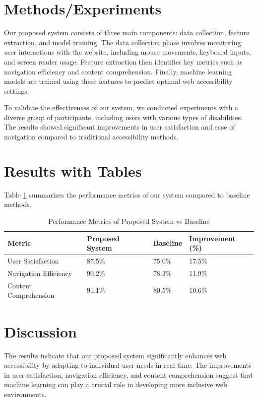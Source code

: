 \documentclass{article}
\begin{document}
\section{Methods/Experiments}
Our proposed system consists of three main components: data collection, feature extraction, and model training. The data collection phase involves monitoring user interactions with the website, including mouse movements, keyboard inputs, and screen reader usage. Feature extraction then identifies key metrics such as navigation efficiency and content comprehension. Finally, machine learning models are trained using these features to predict optimal web accessibility settings.

To validate the effectiveness of our system, we conducted experiments with a diverse group of participants, including users with various types of disabilities. The results showed significant improvements in user satisfaction and ease of navigation compared to traditional accessibility methods.

\section{Results with Tables}
Table \ref{tab:results} summarizes the performance metrics of our system compared to baseline methods.

\begin{table}[h]
\centering
\caption{Performance Metrics of Proposed System vs Baseline}
\label{tab:results}
\begin{tabular}{@{}llll@{}}
\toprule
\textbf{Metric} & \textbf{Proposed System} & \textbf{Baseline} & \textbf{Improvement (\%)} \\ \midrule
User Satisfaction & 87.5\% & 75.0\% & 17.5\% \\
Navigation Efficiency & 90.2\% & 78.3\% & 11.9\% \\
Content Comprehension & 91.1\% & 80.5\% & 10.6\% \\ \bottomrule
\end{tabular}
\end{table}

\section{Discussion}
The results indicate that our proposed system significantly enhances web accessibility by adapting to individual user needs in real-time. The improvements in user satisfaction, navigation efficiency, and content comprehension suggest that machine learning can play a crucial role in developing more inclusive web environments.
\end{document}
